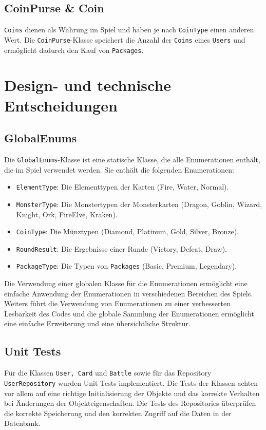 \documentclass[a4paper, 12pt]{article}
\begin{document}
\subsection{CoinPurse \& Coin}
\texttt{Coins} dienen als Währung im Spiel und haben je nach \texttt{CoinType} einen anderen Wert. Die \texttt{CoinPurse}-Klasse speichert die Anzahl der \texttt{Coins} eines \texttt{Users} und ermöglicht dadurch den Kauf von \texttt{Packages}.

\section{Design- und technische Entscheidungen}
\subsection{GlobalEnums}
Die \texttt{GlobalEnums}-Klasse ist eine statische Klasse, die alle Enumerationen enthält, die im Spiel verwendet werden. Sie enthält die folgenden Enumerationen:
\begin{itemize}
    \item \texttt{ElementType}: Die Elementtypen der Karten (Fire, Water, Normal).
    \item \texttt{MonsterType}: Die Monstertypen der Monsterkarten (Dragon, Goblin, Wizard, Knight, Ork, FireElve, Kraken).
    \item \texttt{CoinType}: Die Münztypen (Diamond, Platinum, Gold, Silver, Bronze).
    \item \texttt{RoundResult}: Die Ergebnisse einer Runde (Victory, Defeat, Draw).
    \item \texttt{PackageType}: Die Typen von \texttt{Packages} (Basic, Premium, Legendary).
\end{itemize}
Die Verwendung einer globalen Klasse für die Enumerationen ermöglicht eine einfache Anwendung der Enumerationen in verschiedenen Bereichen des Spiels.
Weiters führt die Verwendung von Enumerationen zu einer verbesserten Lesbarkeit des Codes und die globale Sammlung der Enumerationen ermöglicht eine einfache Erweiterung und eine übersichtliche Struktur.

\subsection{Unit Tests}
Für die Klassen \texttt{User, Card} und \texttt{Battle} sowie für das Repository \texttt{UserRepository} wurden Unit Tests implementiert.
Die Tests der Klassen achten vor allem auf eine richtige Initialisierung der Objekte und das korrekte Verhalten bei Änderungen der Objekteigenschaften. 
Die Tests des Repositories überprüfen die korrekte Speicherung und den korrekten Zugriff auf die Daten in der Datenbank.
\end{document}
